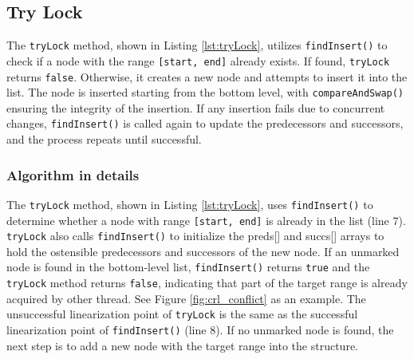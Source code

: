 \subsection{Try Lock}\label{subsec:tryLock}

The \texttt{tryLock} method, shown in Listing \ref{lst:tryLock}, utilizes \texttt{findInsert()} to check if a node with the range \texttt{[start, end]} already exists. If found, \texttt{tryLock} returns \texttt{false}. 
Otherwise, it creates a new node and attempts to insert it into the list. 
The node is inserted starting from the bottom level, with \texttt{compareAndSwap()} ensuring the integrity of the insertion. 
If any insertion fails due to concurrent changes, \texttt{findInsert()} is called again to update the predecessors and successors, and the process repeats until successful.

\vspace{15pt}
\begin{figure}[h]
    \centering
    
\end{figure}

\subsubsection*{Algorithm in details}
The \texttt{tryLock} method, shown in Listing \ref{lst:tryLock}, uses \texttt{findInsert()} to determine whether a node with range \texttt{[start, end]} is already in the list (line 7). 
\texttt{tryLock} also calls \texttt{findInsert()} to initialize the preds[] and succs[] arrays to hold the ostensible predecessors and successors of the new node.
If an unmarked node is found in the bottom-level list, \texttt{findInsert()} returns \texttt{true} and the \texttt{tryLock} method returns \texttt{false}, indicating that part of the target range is already acquired by other thread.
See Figure \ref{fig:crl_conflict} as an example.
The unsuccessful linearization point of \texttt{tryLock} is the same as the successful linearization point of \texttt{findInsert()} (line 8). 
If no unmarked node is found, the next step is to add a new node with the target range into the structure.

